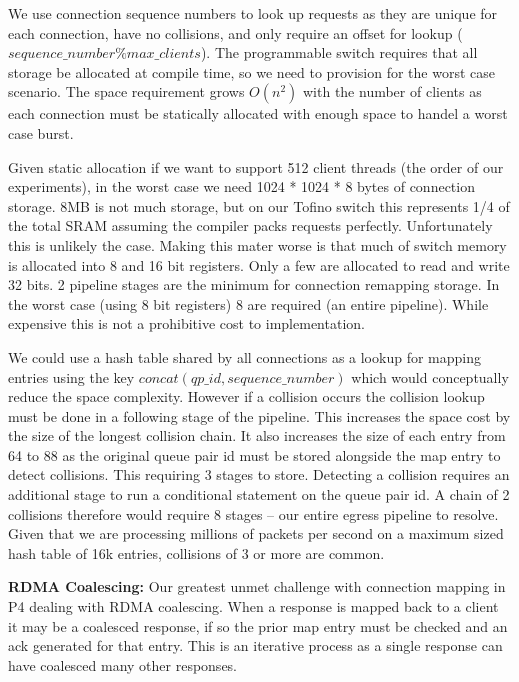 We use connection sequence numbers to look up requests as they are unique for
each connection, have no collisions, and only require an offset for lookup
($sequence\_number \% max\_clients$). The programmable switch requires that all
storage be allocated at compile time, so we need to provision for the worst case
scenario.  The space requirement grows $O(n^2)$ with the number of clients as
each connection must be statically allocated with enough space to handel a worst
case burst.

Given static allocation if we want to support 512 client threads (the order of
our experiments), in the worst case we need 1024 * 1024 * 8 bytes of connection
storage. 8MB is not much storage, but on our Tofino switch this represents 1/4
of the total SRAM assuming the compiler packs requests perfectly. Unfortunately
this is unlikely the case.  Making this mater worse is that much of switch
memory is allocated into 8 and 16 bit registers. Only a few are allocated to
read and write 32 bits. 2 pipeline stages are the minimum for connection
remapping storage. In the worst case (using 8 bit registers) 8 are required (an
entire pipeline). While expensive this is not a prohibitive cost to
implementation.

We could use a hash table shared by all connections as a lookup for mapping
entries using the key $concat(qp\_id,sequence\_number)$ which would conceptually
reduce the space complexity. However if a collision occurs the collision lookup
must be done in a following stage of the pipeline. This increases the space cost
by the size of the longest collision chain. It also increases the size of each
entry from 64 to 88 as the original queue pair id must be stored alongside the
map entry to detect collisions. This requiring 3 stages to store. Detecting a
collision requires an additional stage to run a conditional statement on the
queue pair id. A chain of 2 collisions therefore would require 8 stages -- our
entire egress pipeline to resolve. Given that we are processing millions of
packets per second on a maximum sized hash table of 16k entries, collisions of 3
or more are common.

\textbf{RDMA Coalescing:} Our greatest unmet challenge with connection mapping
in P4 dealing with RDMA coalescing. When a response is mapped back to a client
it may be a coalesced response, if so the prior map entry must be checked and an
ack generated for that entry. This is an iterative process as a single response
can have coalesced many other responses.

